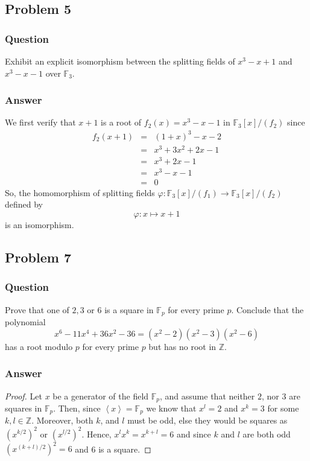 \documentclass[10pt]{article}
\begin{document}
\subsection{Problem 5}
\subsubsection{Question}
Exhibit an explicit isomorphism between the splitting fields of $x^3-x+1$ and $x^3-x-1$ over $\mathbb{F}_3$.
\subsubsection{Answer}
We first verify that $x+1$ is a root of $f_2(x) = x^3-x-1$ in $\mathbb{F}_3[x]/(f_2)$ since
\begin{eqnarray*}f_2(x+1) &=&(1+x)^3  -x  -2 \\
&=& x^3 +3 x^2+2 x-1\\ 
&=& x^3 +2 x-1\\ 
&=& x^3 - x-1\\ 
&=& 0
 \end{eqnarray*}
 So, the homomorphism of splitting fields $\varphi: \mathbb{F}_3[x]/(f_1) \to \mathbb{F}_3[x]/(f_2)$ defined by 
 \[\varphi: x \mapsto x+1\]
 is an isomorphism.

\subsection{Problem 7}
\subsubsection{Question}
Prove that one of $2, 3$ or $6$ is a square in $\mathbb{F}_p$ for every prime $p$. Conclude that the polynomial
\[x^6-11x^4+36x^2-36=(x^2-2)(x^2-3)(x^2-6)\]
has a root modulo $p$ for every prime $p$ but has no root in $\mathbb{Z}$.
\subsubsection{Answer}
\begin{proof}
Let $x$ be a generator of the field $\mathbb{F}_p$, and assume that neither $2$, nor $3$ are squares in $\mathbb{F}_p$. Then, since $\left<x\right> =\mathbb{F}_p$ we know that $x^l =2$ and $x^k=3$ for some $k,l \in \mathbb{Z}$. Moreover, both $k$, and $l$ must be odd, else they would be squares as $(x^{k/2})^2$ or $(x^{l/2})^2$. Hence, $x^l x^k = x^{k+l} =6$ and since $k$ and $l$ are both odd $(x^{(k+l)/2})^2=6$ and 6 is a square.\end{proof}
\end{document}
